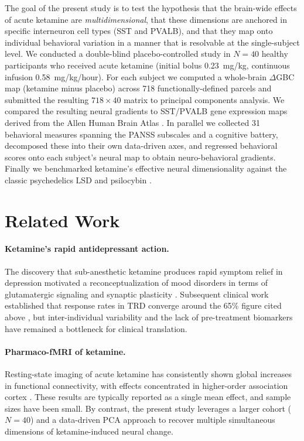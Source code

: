 \documentclass[11pt]{article}
\begin{document}
The goal of the present study is to test the hypothesis that the brain-wide
effects of acute ketamine are \emph{multidimensional}, that these dimensions
are anchored in specific interneuron cell types (SST and PVALB), and that
they map onto individual behavioral variation in a manner that is resolvable
at the single-subject level. We conducted a double-blind placebo-controlled
study in $N=40$ healthy participants who received acute ketamine (initial
bolus 0.23~mg/kg, continuous infusion 0.58~mg/kg/hour). For each subject we
computed a whole-brain $\Delta$GBC map (ketamine minus placebo) across 718
functionally-defined parcels \citep{glasser2016multi,ji2019mapping} and
submitted the resulting $718 \times 40$ matrix to principal components
analysis. We compared the resulting neural gradients to SST/PVALB gene
expression maps derived from the Allen Human Brain Atlas
\citep{hawrylycz2012anatomically}. In parallel we collected 31 behavioral
measures spanning the PANSS subscales \citep{kay1987positive} and a cognitive
battery, decomposed these into their own data-driven axes, and regressed
behavioral scores onto each subject's neural map to obtain neuro-behavioral
gradients. Finally we benchmarked ketamine's effective neural dimensionality
against the classic psychedelics LSD and psilocybin
\citep{carhart2016neural,preller2020psilocybin,preller2018effective}.

\section{Related Work}

\paragraph{Ketamine's rapid antidepressant action.} The discovery that
sub-anesthetic ketamine produces rapid symptom relief in depression
\citep{berman2000ketamine,zarate2006randomized} motivated a
reconceptualization of mood disorders in terms of glutamatergic signaling
and synaptic plasticity \citep{duman2016synaptic}. Subsequent clinical work
established that response rates in TRD converge around the 65\% figure cited
above \citep{murrough2013antidepressant,krystal2019ketamine}, but
inter-individual variability and the lack of pre-treatment biomarkers have
remained a bottleneck for clinical translation.

\paragraph{Pharmaco-fMRI of ketamine.} Resting-state imaging of acute
ketamine has consistently shown global increases in functional connectivity,
with effects concentrated in higher-order association cortex
\citep{driesen2013relationship,anticevic2014ncs,abdallah2018ketamine}. These
results are typically reported as a single mean effect, and sample sizes
have been small. By contrast, the present study leverages a larger cohort
($N=40$) and a data-driven PCA approach to recover multiple simultaneous
dimensions of ketamine-induced neural change.
\end{document}
